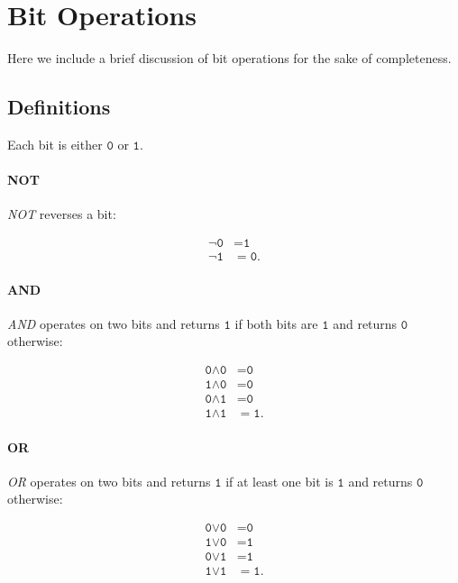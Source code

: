 \section{Bit Operations}

Here we include a brief discussion of bit operations
for the sake of completeness.

\subsection{Definitions}

Each bit is either $\texttt{0}$ or $\texttt{1}$.

\paragraph{NOT}
\emph{NOT} reverses a bit:

\begin{align}
    \lnot\texttt{0} &= \texttt{1} \nonumber\\
    \lnot\texttt{1} &= \texttt{0}.
\end{align}

\paragraph{AND}
\emph{AND} operates on two bits and returns $\texttt{1}$ if both bits are
$\texttt{1}$ and returns $\texttt{0}$ otherwise:

\begin{align}
    \texttt{0}\land\texttt{0} &= \texttt{0} \nonumber\\
    \texttt{1}\land\texttt{0} &= \texttt{0} \nonumber\\
    \texttt{0}\land\texttt{1} &= \texttt{0} \nonumber\\
    \texttt{1}\land\texttt{1} &= \texttt{1}.
\end{align}

\paragraph{OR}
\emph{OR} operates on two bits and returns $\texttt{1}$ if at least one bit
is $\texttt{1}$ and returns $\texttt{0}$ otherwise:

\begin{align}
    \texttt{0}\lor\texttt{0} &= \texttt{0} \nonumber\\
    \texttt{1}\lor\texttt{0} &= \texttt{1} \nonumber\\
    \texttt{0}\lor\texttt{1} &= \texttt{1} \nonumber\\
    \texttt{1}\lor\texttt{1} &= \texttt{1}.
\end{align}

